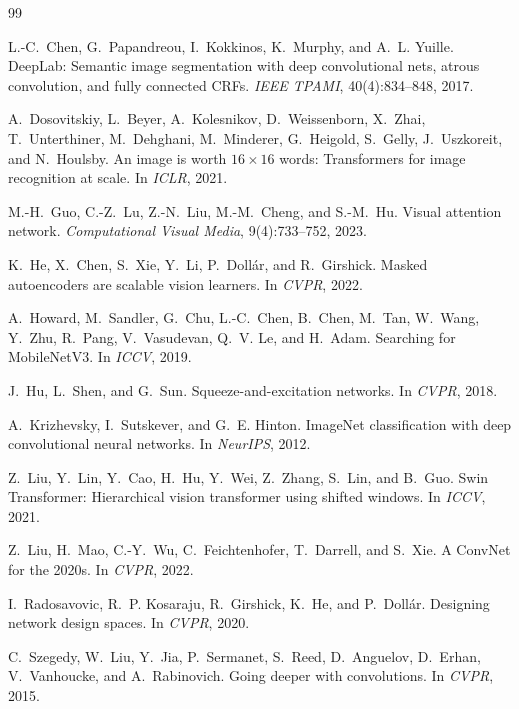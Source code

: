 \documentclass{article}
\begin{document}
{\small
\begin{thebibliography}{99}

L.-C.~Chen, G.~Papandreou, I.~Kokkinos, K.~Murphy, and A.~L. Yuille.
DeepLab: Semantic image segmentation with deep convolutional nets,
atrous convolution, and fully connected CRFs.
\textit{IEEE TPAMI}, 40(4):834--848, 2017.

A.~Dosovitskiy, L.~Beyer, A.~Kolesnikov, D.~Weissenborn, X.~Zhai,
T.~Unterthiner, M.~Dehghani, M.~Minderer, G.~Heigold, S.~Gelly,
J.~Uszkoreit, and N.~Houlsby.
An image is worth $16\times16$ words: Transformers for image
recognition at scale.
In \textit{ICLR}, 2021.

M.-H.~Guo, C.-Z.~Lu, Z.-N.~Liu, M.-M.~Cheng, and S.-M.~Hu.
Visual attention network.
\textit{Computational Visual Media}, 9(4):733--752, 2023.

K.~He, X.~Chen, S.~Xie, Y.~Li, P.~Doll\'{a}r, and R.~Girshick.
Masked autoencoders are scalable vision learners.
In \textit{CVPR}, 2022.

A.~Howard, M.~Sandler, G.~Chu, L.-C.~Chen, B.~Chen, M.~Tan,
W.~Wang, Y.~Zhu, R.~Pang, V.~Vasudevan, Q.~V. Le, and H.~Adam.
Searching for MobileNetV3.
In \textit{ICCV}, 2019.

J.~Hu, L.~Shen, and G.~Sun.
Squeeze-and-excitation networks.
In \textit{CVPR}, 2018.

A.~Krizhevsky, I.~Sutskever, and G.~E. Hinton.
ImageNet classification with deep convolutional neural networks.
In \textit{NeurIPS}, 2012.

Z.~Liu, Y.~Lin, Y.~Cao, H.~Hu, Y.~Wei, Z.~Zhang, S.~Lin, and
B.~Guo.
Swin Transformer: Hierarchical vision transformer using shifted
windows.
In \textit{ICCV}, 2021.

Z.~Liu, H.~Mao, C.-Y.~Wu, C.~Feichtenhofer, T.~Darrell, and S.~Xie.
A ConvNet for the 2020s.
In \textit{CVPR}, 2022.

I.~Radosavovic, R.~P. Kosaraju, R.~Girshick, K.~He, and P.~Doll\'{a}r.
Designing network design spaces.
In \textit{CVPR}, 2020.

C.~Szegedy, W.~Liu, Y.~Jia, P.~Sermanet, S.~Reed, D.~Anguelov,
D.~Erhan, V.~Vanhoucke, and A.~Rabinovich.
Going deeper with convolutions.
In \textit{CVPR}, 2015.


\end{thebibliography}}
\end{document}
